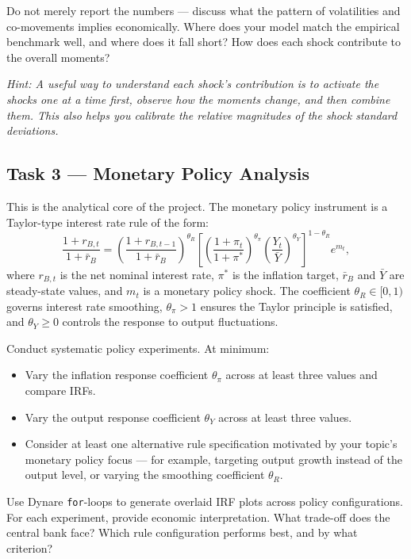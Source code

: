 \documentclass[11pt, a4paper]{article}
\begin{document}
Do not merely report the numbers --- discuss what the pattern of volatilities
and co-movements implies economically. Where does your model match the empirical
benchmark well, and where does it fall short? How does each shock contribute to
the overall moments?

\textit{Hint: A useful way to understand each shock's contribution is to
activate the shocks one at a time first, observe how the moments change, and
then combine them. This also helps you calibrate the relative magnitudes of the
shock standard deviations.}

\subsection{Task 3 --- Monetary Policy Analysis}

This is the analytical core of the project. The monetary policy instrument is a
Taylor-type interest rate rule of the form:
\[
    \frac{1+r_{B,t}}{1+\bar{r}_B}
    =
    \left(\frac{1+r_{B,t-1}}{1+\bar{r}_B}\right)^{\!\theta_R}
    \!\left[
        \left(\frac{1+\pi_t}{1+\pi^*}\right)^{\!\theta_\pi}
        \left(\frac{Y_t}{\bar{Y}}\right)^{\!\theta_Y}
    \right]^{1-\theta_R}
    e^{m_t},
\]
where $r_{B,t}$ is the net nominal interest rate, $\pi^*$ is the inflation
target, $\bar{r}_B$ and $\bar{Y}$ are steady-state values, and $m_t$ is a
monetary policy shock. The coefficient $\theta_R \in [0,1)$ governs interest
rate smoothing, $\theta_\pi > 1$ ensures the Taylor principle is satisfied, and
$\theta_Y \geq 0$ controls the response to output fluctuations.

Conduct systematic policy experiments. At minimum:

\begin{itemize}[noitemsep]
    \item Vary the inflation response coefficient $\theta_\pi$ across at least
          three values and compare IRFs.
    \item Vary the output response coefficient $\theta_Y$ across at least three
          values.
    \item Consider at least one alternative rule specification motivated by your
          topic's monetary policy focus --- for example, targeting output growth
          instead of the output level, or varying the smoothing coefficient
          $\theta_R$.
\end{itemize}

Use Dynare \texttt{for}-loops to generate overlaid IRF plots across policy
configurations. For each experiment, provide economic interpretation. What
trade-off does the central bank face? Which rule configuration performs best,
and by what criterion?
\end{document}
